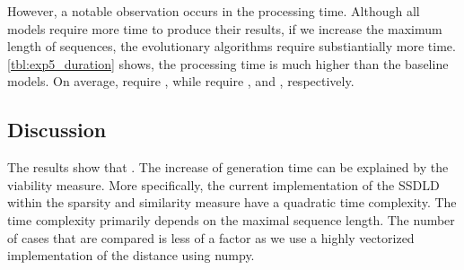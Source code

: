 \documentclass[./../../paper.tex]{subfiles}
\begin{document}
However, a notable observation occurs in the processing time. Although all models require more time to produce their results, if we increase the maximum length of sequences, the evolutionary algorithms require substiantially more time. \autoref{tbl:exp5_duration} shows, the processing time is much higher than the baseline models. On average,  require , while  require ,  and , respectively.

\subsection{Discussion}
The results show that . The increase of generation time can be explained by the viability measure. More specifically, the current implementation of the \gls{SSDLD} within the sparsity and similarity measure have a quadratic time complexity. The time complexity primarily depends on the maximal sequence length. The number of cases that are compared is less of a factor as we use a highly vectorized implementation of the distance using numpy.   
\end{document}
